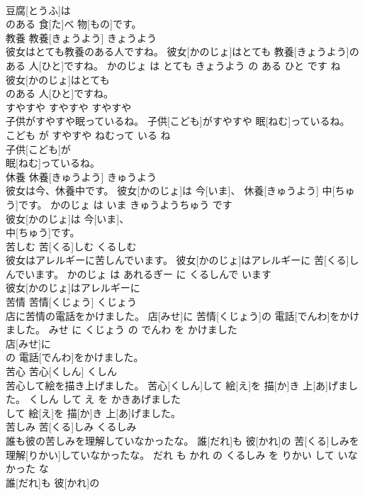 \documentclass[8pt]{extreport}
\begin{document}
\begin{CJK}{UTF8}{min}
\\	豆腐[とうふ]は
\\	のある 食[た]べ 物[もの]です。			
\\	教養	教養[きょうよう]	きょうよう	
\\	彼女はとても教養のある人ですね。	彼女[かのじょ]はとても 教養[きょうよう]のある 人[ひと]ですね。	かのじょ は とても きょうよう の ある ひと です ね	
\\	彼女[かのじょ]はとても
\\	のある 人[ひと]ですね。			
\\	すやすや	すやすや	すやすや	
\\	子供がすやすや眠っているね。	子供[こども]がすやすや 眠[ねむ]っているね。	こども が すやすや ねむって いる ね	
\\	子供[こども]が
\\	眠[ねむ]っているね。			
\\	休養	休養[きゅうよう]	きゅうよう	
\\	彼女は今、休養中です。	彼女[かのじょ]は 今[いま]、 休養[きゅうよう] 中[ちゅう]です。	かのじょ は いま きゅうようちゅう です	
\\	彼女[かのじょ]は 今[いま]、
\\	中[ちゅう]です。			
\\	苦しむ	苦[くる]しむ	くるしむ	
\\	彼女はアレルギーに苦しんでいます。	彼女[かのじょ]はアレルギーに 苦[くる]しんでいます。	かのじょ は あれるぎー に くるしんで います	
\\	彼女[かのじょ]はアレルギーに
\\	苦情	苦情[くじょう]	くじょう	
\\	店に苦情の電話をかけました。	店[みせ]に 苦情[くじょう]の 電話[でんわ]をかけました。	みせ に くじょう の でんわ を かけました	
\\	店[みせ]に
\\	の 電話[でんわ]をかけました。			
\\	苦心	苦心[くしん]	くしん	
\\	苦心して絵を描き上げました。	苦心[くしん]して 絵[え]を 描[か]き 上[あ]げました。	くしん して え を かきあげました	
\\	して 絵[え]を 描[か]き 上[あ]げました。			
\\	苦しみ	苦[くる]しみ	くるしみ	
\\	誰も彼の苦しみを理解していなかったな。	誰[だれ]も 彼[かれ]の 苦[くる]しみを 理解[りかい]していなかったな。	だれ も かれ の くるしみ を りかい して いなかった な	
\\	誰[だれ]も 彼[かれ]の

\end{CJK}
\end{document}
